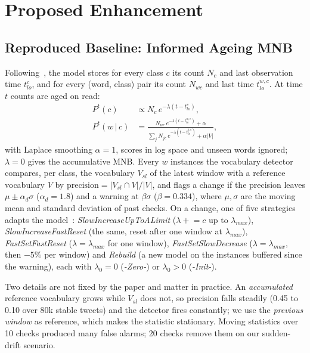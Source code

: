 \documentclass[conference]{IEEEtran}
\begin{document}
\section{Proposed Enhancement}\label{sec:enhancement}

\subsection{Reproduced Baseline: Informed Ageing MNB}
Following~\cite{wagner2015,iosifidis2017}, the model stores for every class $c$ its count $N_c$
and last observation time $t^c_{lo}$, and for every (word, class) pair its count $N_{wc}$ and
last time $t^{w,c}_{lo}$. At time $t$ counts are aged on read:
\begin{align}
P^t(c) &\propto N_c\, e^{-\lambda (t - t^c_{lo})}, \label{eq:prior}\\
P^t(w\,|\,c) &= \frac{N_{wc}\, e^{-\lambda (t - t^{w,c}_{lo})} + \alpha}
  {\sum_{j} N_{jc}\, e^{-\lambda (t - t^{j,c}_{lo})} + \alpha |V|}, \label{eq:likelihood}
\end{align}
with Laplace smoothing $\alpha = 1$, scores in log space and unseen words ignored; $\lambda = 0$
gives the accumulative MNB. Every $w$ instances the vocabulary detector compares, per class,
the vocabulary $V_{sl}$ of the latest window with a reference vocabulary $V$ by
$\mathrm{precision} = |V_{sl} \cap V| / |V|$, and flags a change if the precision leaves
$\mu \pm \alpha_d \sigma$ ($\alpha_d = 1.8$) and a warning at $\beta \sigma$ ($\beta = 0.334$),
where $\mu, \sigma$ are the moving mean and standard deviation of past checks. On a change, one
of five strategies adapts the model~\cite{iosifidis2017}: \emph{SlowIncreaseUpToALimit}
($\lambda \mathrel{+}= c$ up to $\lambda_{max}$), \emph{SlowIncreaseFastReset} (the same, reset
after one window at $\lambda_{max}$), \emph{FastSetFastReset} ($\lambda = \lambda_{max}$ for one
window), \emph{FastSetSlowDecrease} ($\lambda = \lambda_{max}$, then $-5\%$ per window) and
\emph{Rebuild} (a new model on the instances buffered since the warning), each with
$\lambda_0 = 0$ (\emph{-Zero-}) or $\lambda_0 > 0$ (\emph{-Init-}).

Two details are not fixed by the paper and matter in practice. An \emph{accumulated} reference
vocabulary grows while $V_{sl}$ does not, so precision falls steadily (0.45 to 0.10 over 80k
stable tweets) and the detector fires constantly; we use the \emph{previous window} as
reference, which makes the statistic stationary. Moving statistics over 10 checks produced many
false alarms; 20 checks remove them on our sudden-drift scenario.
\end{document}
